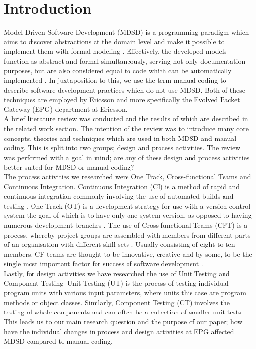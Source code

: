 \documentclass[fina_report_innit.tex]{subfiles}
\begin{document}
\section{Introduction}

Model Driven Software Development (MDSD) is a programming paradigm which aims to discover abstractions at the domain level and make it possible to implement them with formal modeling \cite{stahl2006model}. Effectively, the developed models function as abstract and formal simultaneously, serving not only documentation purposes, but are also considered equal to code which can be automatically implemented \cite{stahl2006model}. In juxtaposition to this, we use the term manual coding to describe software development practices which do not use MDSD. Both of these techniques are employed by Ericsson and more specifically the Evolved Packet Gateway (EPG) department at Ericsson.
\\

A brief literature review was conducted and the results of which are described in the related work section. The intention of the review was to introduce many core concepts, theories and techniques which are used in both MDSD and manual coding. This is split into two groups; design and process activities. The review was performed with a goal in mind; are any of these design and process activities better suited for MDSD or manual coding?
\\

The process activities we researched were One Track, Cross-functional Teams and Continuous Integration. Continuous Integration (CI) is a method of rapid and continuous integration commonly involving the use of automated builds and testing \cite{sommerville10software}. One Track (OT) is a development strategy for use with a version control system the goal of which is to have only one system version, as opposed to having numerous development branches \cite{hribar2008first}. The use of Cross-functional Teams (CFT) is a process, whereby project groups are assembled with members from different parts of an organisation with different skill-sets \cite{henke1993perspective} \cite{ghobadi2011challenges}. Usually consisting of eight to ten members, CF teams are thought to be innovative, creative \cite{ghobadi2011challenges} and by some, to be the single most important factor for success of software development \cite{marchwinski2000technical}.
\\

Lastly, for design activities we have researched the use of Unit Testing and Component Testing. Unit Testing (UT) is the process of testing individual program units with various input parameters, where units this case are program methods or object classes. Similarly, Component Testing (CT) involves the testing of whole components and can often be a collection of smaller unit tests. This leads us to our main research question and the purpose of our paper; how have the individual changes in process and design activities at EPG affected MDSD compared to manual coding.
\\
\end{document}
